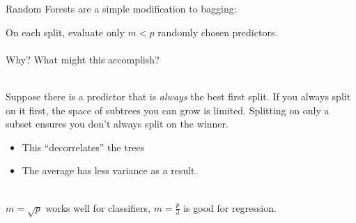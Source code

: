 \documentclass[mathserif, aspectratio=169]{beamer}
\begin{document}
\begin{frame}{Random Forests are a simple modification to bagging:}

On each split, evaluate only $m<p$ randomly chosen predictors.  \\~\\

Why?  What might this accomplish?\\~\\
\pause

Suppose there is a predictor that is \textit{always} the best first split.  If you always split on it first, the space of subtrees you can grow is limited.  Splitting on only a subset ensures you don't always split on the winner.  
\begin{itemize}
\item This ``decorrelates'' the trees
\item The average has less variance as a result.\\~\\
\end{itemize}
\pause
$m=\sqrt{p}$ works well for classifiers, $m=\frac{p}{3}$ is good for regression.
\end{frame}
\end{document}
